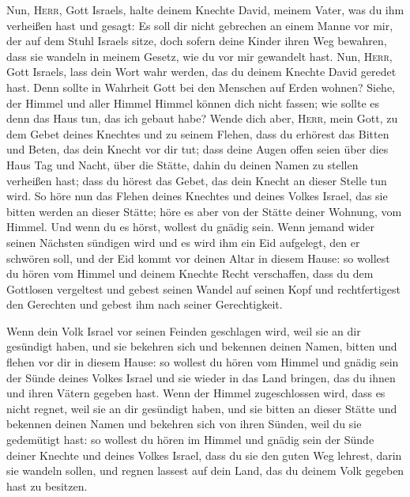  Nun, \textsc{Herr}, Gott Israels, halte deinem Knechte
David, meinem Vater, was du ihm verheißen hast und gesagt: Es soll dir
nicht gebrechen an einem Manne vor mir, der auf dem Stuhl Israels sitze,
doch sofern deine Kinder ihren Weg bewahren, dass sie wandeln in meinem
Gesetz, wie du vor mir gewandelt hast.  Nun,
\textsc{Herr}, Gott Israels, lass dein Wort wahr werden, das du deinem
Knechte David geredet hast.  Denn sollte in Wahrheit Gott
bei den Menschen auf Erden wohnen? Siehe, der Himmel und aller Himmel
Himmel können dich nicht fassen; wie sollte es denn das Haus tun, das
ich gebaut habe?  Wende dich aber, \textsc{Herr}, mein
Gott, zu dem Gebet deines Knechtes und zu seinem Flehen, dass du
erhörest das Bitten und Beten, das dein Knecht vor dir tut;
 dass deine Augen offen seien über dies Haus Tag und
Nacht, über die Stätte, dahin du deinen Namen zu stellen verheißen hast;
dass du hörest das Gebet, das dein Knecht an dieser Stelle tun wird.
 So höre nun das Flehen deines Knechtes und deines Volkes
Israel, das sie bitten werden an dieser Stätte; höre es aber von der
Stätte deiner Wohnung, vom Himmel. Und wenn du es hörst, wollest du
gnädig sein.  Wenn jemand wider seinen Nächsten sündigen
wird und es wird ihm ein Eid aufgelegt, den er schwören soll, und der
Eid kommt vor deinen Altar in diesem Hause:  so wollest
du hören vom Himmel und deinem Knechte Recht verschaffen, dass du dem
Gottlosen vergeltest und gebest seinen Wandel auf seinen Kopf und
rechtfertigest den Gerechten und gebest ihm nach seiner Gerechtigkeit.

 Wenn dein Volk Israel vor seinen Feinden geschlagen
wird, weil sie an dir gesündigt haben, und sie bekehren sich und
bekennen deinen Namen, bitten und flehen vor dir in diesem Hause:
 so wollest du hören vom Himmel und gnädig sein der Sünde
deines Volkes Israel und sie wieder in das Land bringen, das du ihnen
und ihren Vätern gegeben hast.  Wenn der Himmel
zugeschlossen wird, dass es nicht regnet, weil sie an dir gesündigt
haben, und sie bitten an dieser Stätte und bekennen deinen Namen und
bekehren sich von ihren Sünden, weil du sie gedemütigt hast:
 so wollest du hören im Himmel und gnädig sein der Sünde
deiner Knechte und deines Volkes Israel, dass du sie den guten Weg
lehrest, darin sie wandeln sollen, und regnen lassest auf dein Land, das
du deinem Volk gegeben hast zu besitzen.

